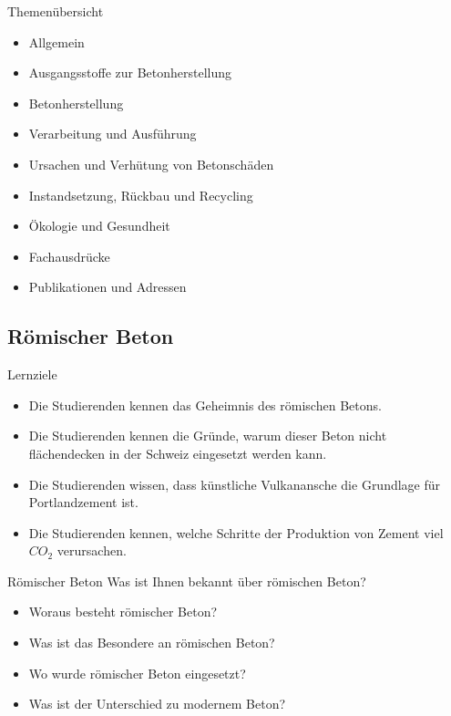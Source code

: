 \begin{frame}{Themenübersicht}
    \begin{itemize}
        \item Allgemein
        \item Ausgangsstoffe zur Betonherstellung
        \item Betonherstellung
        \item Verarbeitung und Ausführung
        \item Ursachen und Verhütung von Betonschäden
        \item Instandsetzung, Rückbau und Recycling
        \item Ökologie und Gesundheit
        \item Fachausdrücke
        \item Publikationen und Adressen
    \end{itemize}
\end{frame}


\subsection{Römischer Beton}
\begin{frame}{Lernziele}
    \begin{myLernziele}
        \begin{itemize}
            \item[\textbullet] Die Studierenden kennen das Geheimnis des römischen Betons.
            \item[\textbullet] Die Studierenden kennen die Gründe, warum dieser Beton nicht flächendecken in der Schweiz eingesetzt werden kann.
            \item[\textbullet] Die Studierenden wissen, dass künstliche Vulkanansche die Grundlage für Portlandzement ist.
            \item[\textbullet] Die Studierenden kennen, welche Schritte der Produktion von Zement viel $CO_2$ verursachen.
        \end{itemize}
    \end{myLernziele}

\end{frame}


\begin{frame}{Römischer Beton}
    Was ist Ihnen bekannt über römischen Beton?
    \begin{itemize}
        \item[\textbullet]  Woraus besteht römischer Beton?
        \item[\textbullet]  Was ist das Besondere an römischen Beton?
        \item[\textbullet]  Wo wurde römischer Beton eingesetzt?
        \item[\textbullet]  Was ist der Unterschied zu modernem Beton?
    \end{itemize}

\end{frame}



